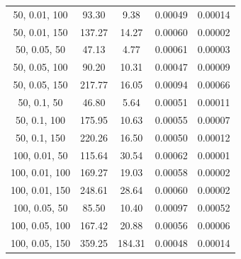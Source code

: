 \documentclass{article}
\begin{document}
\begin{table}[H]
{\begin{tabular}{|c|c|c|c|c|}
                50, 0.01, 100              & 93.30                  & 9.38                  & 0.00049                  & 0.00014                 \\
                50, 0.01, 150              & 137.27                 & 14.27                 & 0.00060                  & 0.00002                 \\
                50, 0.05, 50               & 47.13                  & 4.77                  & 0.00061                  & 0.00003                 \\
                50, 0.05, 100              & 90.20                  & 10.31                 & 0.00047                  & 0.00009                 \\
                50, 0.05, 150              & 217.77                 & 16.05                 & 0.00094                  & 0.00066                 \\
                50, 0.1, 50                & 46.80                  & 5.64                  & 0.00051                  & 0.00011                 \\
                50, 0.1, 100               & 175.95                 & 10.63                 & 0.00055                  & 0.00007                 \\
                50, 0.1, 150               & 220.26                 & 16.50                 & 0.00050                  & 0.00012                 \\
                100, 0.01, 50              & 115.64                 & 30.54                 & 0.00062                  & 0.00001                 \\
                100, 0.01, 100             & 169.27                 & 19.03                 & 0.00058                  & 0.00002                 \\
                100, 0.01, 150             & 248.61                 & 28.64                 & 0.00060                  & 0.00002                 \\
                100, 0.05, 50              & 85.50                  & 10.40                 & 0.00097                  & 0.00052                 \\
                100, 0.05, 100             & 167.42                 & 20.88                 & 0.00056                  & 0.00006                 \\
                100, 0.05, 150             & 359.25                 & 184.31                & 0.00048                  & 0.00014                 \\

\end{tabular}}
\end{table}
\end{document}
